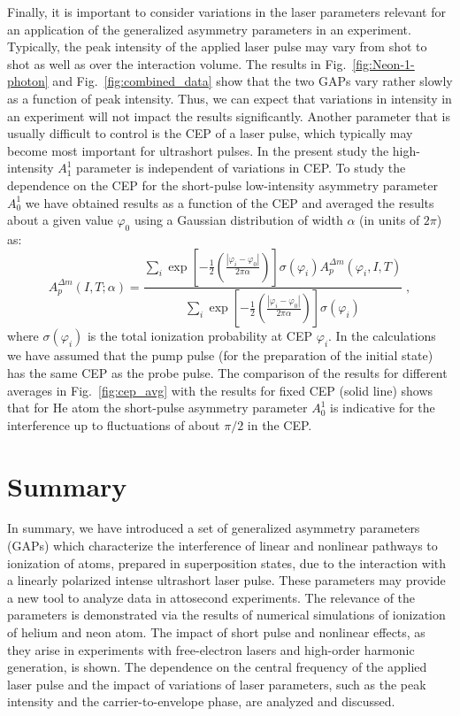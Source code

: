 Finally, it is important to consider variations in the laser parameters relevant for an application of the generalized asymmetry parameters in an experiment. Typically, the peak intensity of the applied laser pulse may vary from shot to shot as well as over the interaction volume. The results in Fig.\ \ref{fig:Neon-1-photon} and Fig.\ \ref{fig:combined_data} show that the two GAPs vary rather slowly as a function of peak intensity. Thus, we can expect that variations in intensity in an experiment will not impact the results significantly. Another parameter that is usually difficult to control is the CEP of a laser pulse, which typically may become most important for ultrashort pulses. In the present study the high-intensity $A_1^{1}$ parameter is independent of variations in CEP. To study the dependence on the CEP for the short-pulse low-intensity asymmetry parameter $A_0^{1}$ we have obtained results as a function of the CEP and averaged the results about a given value $\varphi_0$ using a Gaussian distribution of width $\alpha$ (in units of $2\pi$) as: 
%
\begin{equation}
A_{p}^{\Delta m}(I, T; \alpha)
= 
\frac{\sum_i \exp\left[-\frac{1}{2}\left(\frac{|\varphi_i-\varphi_0|}{2\pi\alpha}\right)\right] \sigma(\varphi_i) A_{p}^{\Delta m}(\varphi_i,I,T) }
{\sum_i\exp\left[-\frac{1}{2}\left(\frac{|\varphi_i-\varphi_0|}{2\pi\alpha}\right)\right]\sigma(\varphi_i)}\; ,
    \label{eq:PAD_gauss_window}
\end{equation}
%
where $\sigma(\varphi_i)$ is the total ionization probability at CEP $\varphi_i$. 
In the calculations we have assumed that the pump pulse (for the preparation of the initial state) has the same CEP as the probe pulse.
The comparison of the results for different averages in Fig.\ \ref{fig:cep_avg} with the results for fixed CEP (solid line) shows that for He atom the short-pulse asymmetry parameter $A_0^1$ is indicative for the interference up to fluctuations of about $\pi/2$ in the CEP. 


\section*{Summary}


In summary, we have introduced a set of generalized asymmetry parameters (GAPs) which characterize the interference of linear and nonlinear pathways to ionization of atoms, prepared in superposition states, due to the interaction with a linearly polarized intense ultrashort laser pulse. These parameters may provide a new tool to analyze data in attosecond experiments. The relevance of the parameters is demonstrated via the results of numerical simulations of ionization of helium and neon atom. The impact of short pulse and nonlinear effects, as they arise in experiments with free-electron lasers and high-order harmonic generation, is shown. The dependence on the central frequency of the applied laser pulse and the impact of variations of laser parameters, such as the peak intensity and the carrier-to-envelope phase, are analyzed and discussed.

